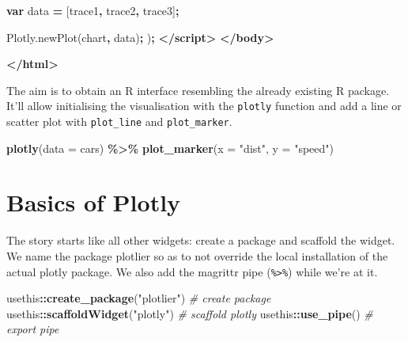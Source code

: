 \documentclass[
]{krantz}
\makeatletter
\newenvironment{Shaded}{\begin{snugshade}}{\end{snugshade}}
\newcommand{\AttributeTok}[1]{\textcolor[rgb]{0.61,0.61,0.61}{#1}}
\newcommand{\CommentTok}[1]{\textcolor[rgb]{0.37,0.37,0.37}{\textit{#1}}}
\newcommand{\DataTypeTok}[1]{\textcolor[rgb]{0.27,0.27,0.27}{#1}}
\newcommand{\KeywordTok}[1]{\textcolor[rgb]{0.27,0.27,0.27}{\textbf{#1}}}
\newcommand{\NormalTok}[1]{#1}
\newcommand{\OperatorTok}[1]{\textcolor[rgb]{0.43,0.43,0.43}{\textbf{#1}}}
\newcommand{\StringTok}[1]{\textcolor[rgb]{0.5,0.5,0.5}{#1}}
\newcommand{\VariableTok}[1]{\textcolor[rgb]{0,0,0}{#1}}
\newenvironment{kframe}{%
\medskip{}
\setlength{\fboxsep}{.8em}
 \def\at@end@of@kframe{}%
 \ifinner\ifhmode%
  \def\at@end@of@kframe{\end{minipage}}%
  \begin{minipage}{\columnwidth}%
 \fi\fi%
 \def\FrameCommand##1{\hskip\@totalleftmargin \hskip-\fboxsep
 \colorbox{shadecolor}{##1}\hskip-\fboxsep
     \hskip-\linewidth \hskip-\@totalleftmargin \hskip\columnwidth}%
 \MakeFramed {\advance\hsize-\width
   \@totalleftmargin\z@ \linewidth\hsize
   \@setminipage}}%
 {\par\unskip\endMakeFramed%
 \at@end@of@kframe}
\renewenvironment{Shaded}{\begin{kframe}}{\end{kframe}}
\makeatother
\begin{document}
\begin{Shaded}
\begin{Highlighting}[]
    \KeywordTok{var}\NormalTok{ data }\OperatorTok{=}\NormalTok{ [trace1}\OperatorTok{,}\NormalTok{ trace2}\OperatorTok{,}\NormalTok{ trace3]}\OperatorTok{;}

    \VariableTok{Plotly}\NormalTok{.}\AttributeTok{newPlot}\NormalTok{(}\StringTok{\textquotesingle{}chart\textquotesingle{}}\OperatorTok{,}\NormalTok{ data)}\OperatorTok{;}
\NormalTok{    )}\OperatorTok{;}
  \KeywordTok{</script>}
\KeywordTok{</body>}

\KeywordTok{</html>}
\end{Highlighting}
\end{Shaded}

The aim is to obtain an R interface resembling the already existing R package. It'll allow initialising the visualisation with the \texttt{plotly} function and add a line or scatter plot with \texttt{plot\_line} and \texttt{plot\_marker}.

\begin{Shaded}
\begin{Highlighting}[]
\KeywordTok{plotly}\NormalTok{(}\DataTypeTok{data =}\NormalTok{ cars) }\OperatorTok{\%>\%}\StringTok{ }
\StringTok{  }\KeywordTok{plot\_marker}\NormalTok{(}\DataTypeTok{x =} \StringTok{"dist"}\NormalTok{, }\DataTypeTok{y =} \StringTok{"speed"}\NormalTok{)}
\end{Highlighting}
\end{Shaded}

\hypertarget{widgets-ex-plotly-basics}{%
\section{Basics of Plotly}\label{widgets-ex-plotly-basics}}

The story starts like all other widgets: create a package and scaffold the widget. We name the package plotlier so as to not override the local installation of the actual plotly package. We also add the magrittr pipe (\texttt{\%\textgreater{}\%}) while we're at it.

\begin{Shaded}
\begin{Highlighting}[]
\NormalTok{usethis}\OperatorTok{::}\KeywordTok{create\_package}\NormalTok{(}\StringTok{"plotlier"}\NormalTok{) }\CommentTok{\# create package}
\NormalTok{usethis}\OperatorTok{::}\KeywordTok{scaffoldWidget}\NormalTok{(}\StringTok{"plotly"}\NormalTok{) }\CommentTok{\# scaffold plotly}
\NormalTok{usethis}\OperatorTok{::}\KeywordTok{use\_pipe}\NormalTok{() }\CommentTok{\# export pipe}
\end{Highlighting}
\end{Shaded}
\end{document}
